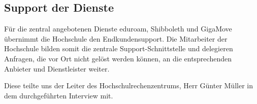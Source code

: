 \subsection{Support der Dienste}
Für die zentral angebotenen Dienste eduroam, Shibboleth und GigaMove übernimmt die Hochschule den Endkundensupport. Die Mitarbeiter der Hochschule bilden somit die zentrale Support-Schnittstelle und delegieren Anfragen, die vor Ort nicht gelöst werden können, an die entsprechenden Anbieter und Dienstleister weiter.

Diese teilte uns der Leiter des Hochschulrechenzentrums, Herr Günter Müller in dem durchgeführten Interview mit.